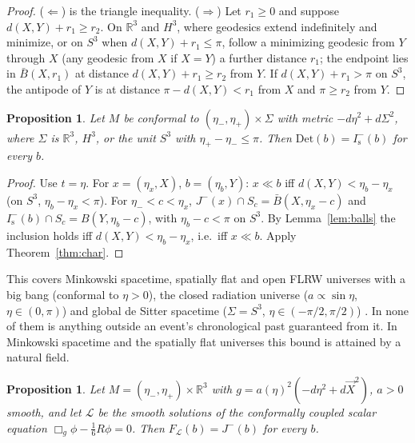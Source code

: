 \documentclass[11pt]{article}
\newtheorem{proposition}[theorem]{Proposition}
\theoremstyle{definition}
\newcommand{\Is}{I^-_{\mathrm s}}
\newcommand{\Det}{\mathrm{Det}}
\begin{document}
\begin{proof}
($\Leftarrow$) is the triangle inequality. ($\Rightarrow$) Let $r_1\ge0$ and suppose
$d(X,Y)+r_1\ge r_2$. On $\mathbb R^3$ and $H^3$, where geodesics extend
indefinitely and minimize, or on $S^3$ when $d(X,Y)+r_1\le\pi$, follow a minimizing geodesic from $Y$ through $X$ (any geodesic from
$X$ if $X=Y$) a further distance $r_1$; the endpoint lies in $\bar B(X,r_1)$ at
distance $d(X,Y)+r_1\ge r_2$ from $Y$. If $d(X,Y)+r_1>\pi$ on $S^3$, the
antipode of $Y$ is at distance $\pi-d(X,Y)<r_1$ from $X$ and $\pi\ge r_2$ from
$Y$.
\end{proof}

\begin{proposition}\label{prop:conformal}
Let $M$ be conformal to $(\eta_-,\eta_+)\times\Sigma$ with metric
$-d\eta^2+d\Sigma^2$, where $\Sigma$ is $\mathbb R^3$, $H^3$, or the unit $S^3$
with $\eta_+-\eta_-\le\pi$. Then $\Det(b)=\Is(b)$ for every $b$.
\end{proposition}

\begin{proof}
Use $t=\eta$. For $x=(\eta_x,X)$, $b=(\eta_b,Y)$: $x\ll b$ iff
$d(X,Y)<\eta_b-\eta_x$ (on $S^3$, $\eta_b-\eta_x<\pi$). For $\eta_-<c<\eta_x$,
$J^-(x)\cap S_c=\bar B(X,\eta_x-c)$ and $\Is(b)\cap S_c=B(Y,\eta_b-c)$, with
$\eta_b-c<\pi$ on $S^3$. By Lemma~\ref{lem:balls} the inclusion holds iff
$d(X,Y)<\eta_b-\eta_x$, i.e.\ iff $x\ll b$. Apply Theorem~\ref{thm:char}.
\end{proof}

This covers Minkowski spacetime, spatially flat and open FLRW universes with
a big bang (conformal to $\eta>0$), the closed radiation universe
($a\propto\sin\eta$, $\eta\in(0,\pi)$) and global de Sitter spacetime ($\Sigma=S^3$,
$\eta\in(-\pi/2,\pi/2)$) \citep{HE1973}. In none of them is anything outside an
event's chronological past guaranteed from it. In Minkowski spacetime and the
spatially flat universes this bound is attained by a natural field.

\begin{proposition}\label{prop:sharp}
Let $M=(\eta_-,\eta_+)\times\mathbb R^3$ with $g=a(\eta)^2(-d\eta^2+d\vec X^2)$,
$a>0$ smooth, and let $\mathcal L$ be the smooth solutions of the conformally
coupled scalar equation $\Box_g\phi-\tfrac16R\phi=0$. Then
$F_{\mathcal L}(b)=J^-(b)$ for every $b$.
\end{proposition}
\end{document}
